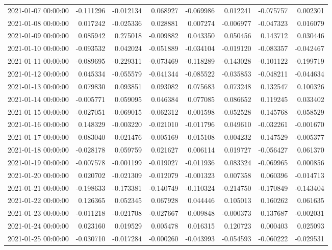 \begin{tabular}{lrrrrrrr}
2021-01-07 00:00:00 & -0.111296 & -0.012134 & 0.068927 & -0.069986 & 0.012241 & -0.075757 & 0.002301 \\
2021-01-08 00:00:00 & 0.017242 & -0.025336 & 0.028881 & 0.007274 & -0.006977 & -0.047323 & 0.016079 \\
2021-01-09 00:00:00 & 0.085942 & 0.275018 & -0.009882 & 0.043350 & 0.050456 & 0.143712 & 0.030446 \\
2021-01-10 00:00:00 & -0.093532 & 0.042024 & -0.051889 & -0.034104 & -0.019120 & -0.083357 & -0.042467 \\
2021-01-11 00:00:00 & -0.089695 & -0.229311 & -0.073469 & -0.118289 & -0.143028 & -0.101122 & -0.199719 \\
2021-01-12 00:00:00 & 0.045334 & -0.055579 & -0.041344 & -0.085522 & -0.035853 & -0.048211 & -0.044634 \\
2021-01-13 00:00:00 & 0.079830 & 0.093851 & 0.093082 & 0.075683 & 0.073248 & 0.132547 & 0.100326 \\
2021-01-14 00:00:00 & -0.005771 & 0.059095 & 0.046384 & 0.077085 & 0.086652 & 0.119245 & 0.033402 \\
2021-01-15 00:00:00 & -0.027051 & -0.069015 & -0.062312 & -0.001598 & -0.052528 & 0.145768 & -0.058529 \\
2021-01-16 00:00:00 & 0.148329 & -0.003220 & -0.021010 & -0.011796 & 0.049610 & -0.032261 & -0.001670 \\
2021-01-17 00:00:00 & 0.083040 & -0.021476 & -0.005169 & -0.015108 & 0.004232 & 0.147529 & -0.005377 \\
2021-01-18 00:00:00 & -0.028178 & 0.059759 & 0.021627 & 0.006114 & 0.019727 & -0.056427 & 0.061370 \\
2021-01-19 00:00:00 & -0.007578 & -0.001199 & -0.019027 & -0.011936 & 0.083324 & -0.069965 & 0.000856 \\
2021-01-20 00:00:00 & 0.020702 & -0.021309 & -0.012079 & -0.001323 & 0.007358 & 0.060396 & -0.014713 \\
2021-01-21 00:00:00 & -0.198633 & -0.173381 & -0.140749 & -0.110324 & -0.214750 & -0.170849 & -0.143404 \\
2021-01-22 00:00:00 & 0.126365 & 0.052345 & 0.067928 & 0.044446 & 0.105013 & 0.160262 & 0.061635 \\
2021-01-23 00:00:00 & -0.011218 & -0.021708 & -0.027667 & 0.009848 & -0.000373 & 0.137687 & -0.002031 \\
2021-01-24 00:00:00 & 0.023160 & 0.019529 & 0.005478 & 0.016315 & 0.120723 & 0.000403 & 0.025093 \\
2021-01-25 00:00:00 & -0.030710 & -0.017284 & -0.000260 & -0.043993 & -0.054593 & -0.060222 & -0.029531 \\

\end{tabular}
